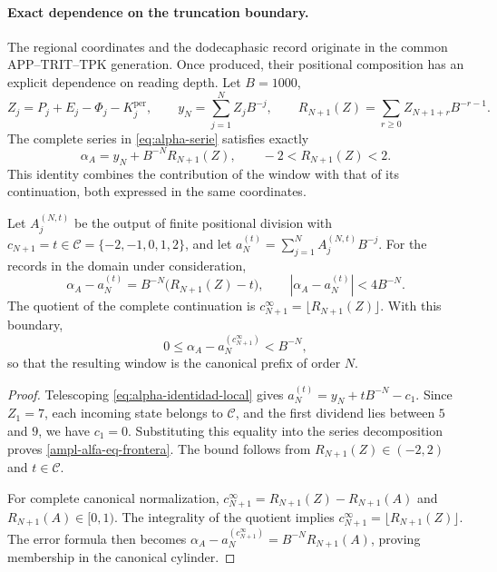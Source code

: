\paragraph{Exact dependence on the truncation boundary.}
\label{ampl-alfa-frontera-exacta}
The regional coordinates and the dodecaphasic record originate in the
common APP--TRIT--TPK generation. Once produced, their positional
composition has an explicit dependence on reading depth.
Let $B=1000$,
\[
 Z_j=P_j+E_j-\Phi_j-K_j^{\mathrm{per}},\qquad
 y_N=\sum_{j=1}^{N}Z_jB^{-j},\qquad
 R_{N+1}(Z)=\sum_{r\geq0}Z_{N+1+r}B^{-r-1}.
\]
The complete series in \eqref{eq:alpha-serie} satisfies exactly
\[
 \alpha_A=y_N+B^{-N}R_{N+1}(Z),\qquad
 -2<R_{N+1}(Z)<2.
\]
This identity combines the contribution of the window with that of its
continuation, both expressed in the same coordinates.

\begin{proposition}
\label{ampl-alfa-prop-frontera}
Let $A_j^{(N,t)}$ be the output of finite positional division with
$c_{N+1}=t\in\mathcal C=\{-2,-1,0,1,2\}$, and let
$a_N^{(t)}=\sum_{j=1}^{N}A_j^{(N,t)}B^{-j}$. For the records in the
domain under consideration,
\begin{equation}
 \alpha_A-a_N^{(t)}
 =B^{-N}\bigl(R_{N+1}(Z)-t\bigr),
 \qquad
 |\alpha_A-a_N^{(t)}|<4B^{-N}.
 \label{ampl-alfa-eq-frontera}
\end{equation}
The quotient of the complete continuation is
$c_{N+1}^{\infty}=\lfloor R_{N+1}(Z)\rfloor$. With this boundary,
\[
 0\leq\alpha_A-a_N^{(c_{N+1}^{\infty})}<B^{-N},
\]
so that the resulting window is the canonical prefix of order $N$.
\end{proposition}
\begin{proof}
Telescoping \eqref{eq:alpha-identidad-local} gives
$a_N^{(t)}=y_N+tB^{-N}-c_1$. Since $Z_1=7$, each incoming state
belongs to $\mathcal C$, and the first dividend lies between $5$ and $9$,
we have $c_1=0$. Substituting this equality into the series decomposition
proves \eqref{ampl-alfa-eq-frontera}. The bound follows from
$R_{N+1}(Z)\in(-2,2)$ and $t\in\mathcal C$.

For complete canonical normalization,
$c_{N+1}^{\infty}=R_{N+1}(Z)-R_{N+1}(A)$ and
$R_{N+1}(A)\in[0,1)$. The integrality of the quotient implies
$c_{N+1}^{\infty}=\lfloor R_{N+1}(Z)\rfloor$. The error formula
then becomes
$\alpha_A-a_N^{(c_{N+1}^{\infty})}=B^{-N}R_{N+1}(A)$, proving
membership in the canonical cylinder.
\end{proof}

